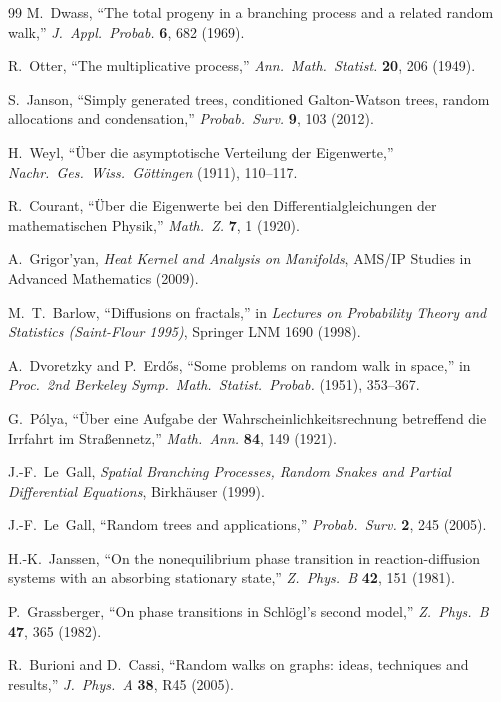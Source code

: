 \documentclass[11pt,a4paper]{article}
\theoremstyle{definition}
\begin{document}
\begin{thebibliography}{99}
M.~Dwass, ``The total progeny in a branching process and a related random walk,''
\emph{J.\ Appl.\ Probab.} \textbf{6}, 682 (1969).

R.~Otter, ``The multiplicative process,''
\emph{Ann.\ Math.\ Statist.} \textbf{20}, 206 (1949).

S.~Janson, ``Simply generated trees, conditioned Galton-Watson trees,
random allocations and condensation,''
\emph{Probab.\ Surv.} \textbf{9}, 103 (2012).

H.~Weyl, ``\"Uber die asymptotische Verteilung der Eigenwerte,''
\emph{Nachr.\ Ges.\ Wiss.\ G\"ottingen} (1911), 110--117.

R.~Courant, ``\"Uber die Eigenwerte bei den Differentialgleichungen
der mathematischen Physik,''
\emph{Math.\ Z.} \textbf{7}, 1 (1920).

A.~Grigor'yan, \emph{Heat Kernel and Analysis on Manifolds},
AMS/IP Studies in Advanced Mathematics (2009).

M.~T.~Barlow, ``Diffusions on fractals,''
in \emph{Lectures on Probability Theory and Statistics (Saint-Flour 1995)},
Springer LNM 1690 (1998).

A.~Dvoretzky and P.~Erd\H{o}s, ``Some problems on random walk in space,''
in \emph{Proc.\ 2nd Berkeley Symp.\ Math.\ Statist.\ Probab.} (1951), 353--367.

G.~P\'{o}lya, ``\"Uber eine Aufgabe der Wahrscheinlichkeitsrechnung
betreffend die Irrfahrt im Stra\ss ennetz,''
\emph{Math.\ Ann.} \textbf{84}, 149 (1921).

J.-F.~Le~Gall, \emph{Spatial Branching Processes, Random Snakes and
Partial Differential Equations}, Birkh\"auser (1999).

J.-F.~Le~Gall, ``Random trees and applications,''
\emph{Probab.\ Surv.} \textbf{2}, 245 (2005).

H.-K.~Janssen, ``On the nonequilibrium phase transition in
reaction-diffusion systems with an absorbing stationary state,''
\emph{Z.\ Phys.\ B} \textbf{42}, 151 (1981).

P.~Grassberger, ``On phase transitions in Schl\"ogl's second model,''
\emph{Z.\ Phys.\ B} \textbf{47}, 365 (1982).

R.~Burioni and D.~Cassi, ``Random walks on graphs: ideas,
techniques and results,''
\emph{J.\ Phys.\ A} \textbf{38}, R45 (2005).


\end{thebibliography}
\end{document}
